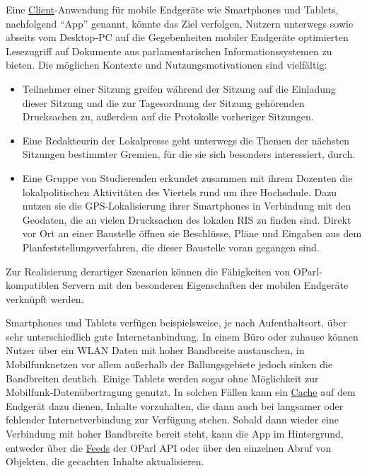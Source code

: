 \documentclass[,a4paper]{article}
\begin{document}
Eine \hyperref[client]{Client}-Anwendung für mobile Endgeräte wie
Smartphones und Tablets, nachfolgend ``App'' genannt, könnte das Ziel
verfolgen, Nutzern unterwegs sowie abseits vom Desktop-PC auf die
Gegebenheiten mobiler Endgeräte optimierten Lesezugriff auf Dokumente
aus parlamentarischen Informationssystemen zu bieten. Die möglichen
Kontexte und Nutzungsmotivationen sind vielfältig:

\begin{itemize}
\item
  Teilnehmer einer Sitzung greifen während der Sitzung auf die Einladung
  dieser Sitzung und die zur Tagesordnung der Sitzung gehörenden
  Drucksachen zu, außerdem auf die Protokolle vorheriger Sitzungen.
\item
  Eine Redakteurin der Lokalpresse geht unterwegs die Themen der
  nächsten Sitzungen bestimmter Gremien, für die sie sich besonders
  interessiert, durch.
\item
  Eine Gruppe von Studierenden erkundet zusammen mit ihrem Dozenten die
  lokalpolitischen Aktivitäten des Viertels rund um ihre Hochschule.
  Dazu nutzen sie die GPS-Lokalisierung ihrer Smartphones in Verbindung
  mit den Geodaten, die an vielen Drucksachen des lokalen RIS zu finden
  sind. Direkt vor Ort an einer Baustelle öffnen sie Beschlüsse, Pläne
  und Eingaben aus dem Planfeststellungsverfahren, die dieser Baustelle
  voran gegangen sind.
\end{itemize}

Zur Realisierung derartiger Szenarien können die Fähigkeiten von
OParl-kompatiblen Servern mit den besonderen Eigenschaften der mobilen
Endgeräte verknüpft werden.

Smartphones und Tablets verfügen beispielsweise, je nach Aufenthaltsort,
über sehr unterschiedlich gute Internetanbindung. In einem Büro oder
zuhause können Nutzer über ein WLAN Daten mit hoher Bandbreite
austauschen, in Mobilfunknetzen vor allem außerhalb der Ballungsgebiete
jedoch sinken die Bandbreiten deutlich. Einige Tablets werden sogar ohne
Möglichkeit zur Mobilfunk-Datenübertragung genutzt. In solchen Fällen
kann ein \hyperref[cache]{Cache} auf dem Endgerät dazu dienen, Inhalte
vorzuhalten, die dann auch bei langsamer oder fehlender
Internetverbindung zur Verfügung stehen. Sobald dann wieder eine
Verbindung mit hoher Bandbreite bereit steht, kann die App im
Hintergrund, entweder über die \hyperref[feeds]{Feeds} der OParl API
oder über den einzelnen Abruf von Objekten, die gecachten Inhalte
aktualisieren.
\end{document}
